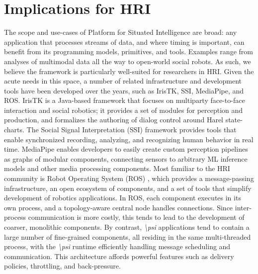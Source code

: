 \documentclass[letterpaper]{article} %
\newcommand{\psif}{\emph{\textbackslash psi} }
\begin{document}
\vspace{-2.14mm}
\section{Implications for HRI}

The scope and use-cases of Platform for Situated Intelligence are broad: any application that processes streams of data, and where timing is important, can benefit from its programming models, primitives, and tools. Examples range from analyses of multimodal data all the way to open-world social robots. As such, we believe the framework is particularly well-suited for researchers in HRI.  Given the acute needs in this space, a number of related infrastructure and development tools have been developed over the years, such as IrisTK, SSI, MediaPipe, and ROS. IrisTK \cite{skantze2012iristk} is a Java-based framework that focuses on multiparty face-to-face interaction and social robotics; it provides a set of modules for perception and production, and formalizes the authoring of dialog control around Harel state-charts. The Social Signal Interpretation (SSI) framework \cite{wagner2013social} provides tools that enable synchronized recording, analyzing, and recognizing human behavior in real time. MediaPipe \cite{lugaresi2019mediapipe} enables developers to easily create custom perception pipelines as graphs of modular components, connecting sensors to arbitrary ML inference models and other media processing components.  Most familiar to the HRI community is Robot Operating System (ROS) \cite{Quigley09}, which provides a message-passing infrastructure, an open ecosystem of components, and a set of tools that simplify development of robotics applications. In ROS, each component executes in its own process, and a topology-aware central node handles connections. Since inter-process communication is more costly, this tends to lead to the development of coarser, monolithic components. By contrast, \psif applications tend to contain a large number of fine-grained components, all residing in the same multi-threaded process, with the \psif runtime efficiently handling message scheduling and communication. This architecture affords powerful features such as delivery policies, throttling, and back-pressure.
\end{document}

